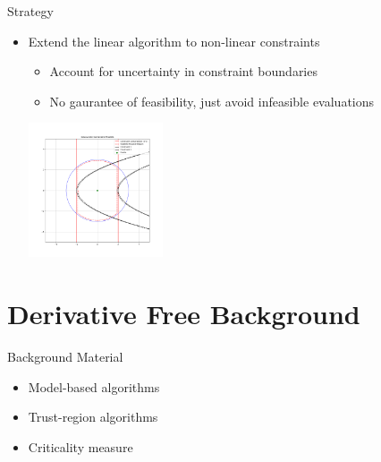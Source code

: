 \documentclass{beamer}
\begin{document}
\begin{frame}{Strategy}
	\begin{itemize}
		\item Extend the linear algorithm to non-linear constraints
		\begin{itemize}
			\item Account for uncertainty in constraint boundaries
			\item No gaurantee of feasibility, just avoid infeasible evaluations
		\end{itemize}
		\begin{center}
			\includegraphics[width=150px]{images/modeled_constraints.png}
		\end{center}
	\end{itemize}
\end{frame}




\section{Derivative Free Background}


\begin{frame}{Background Material}
	\begin{itemize}
		\setlength\itemsep{2em}
		\item Model-based algorithms
		\item Trust-region algorithms
		\item Criticality measure
	\end{itemize}
\end{frame}
\end{document}

